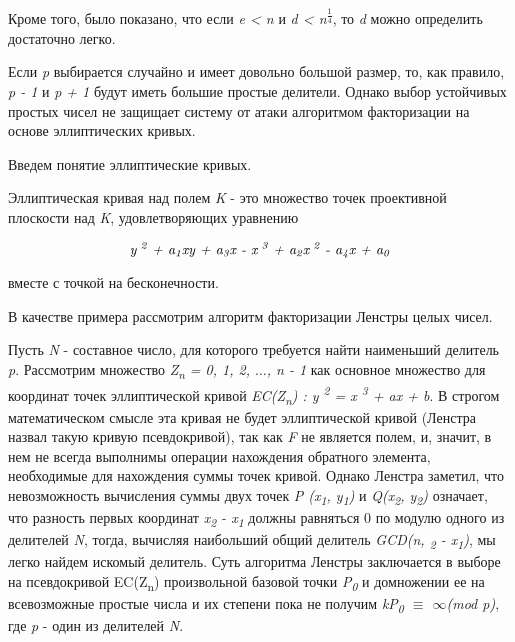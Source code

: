   Кроме того, было показано, что если \textit{e < n} и \textit{d < n\textsuperscript{ {$\frac{1}{4}$}}}, то \textit{d} можно определить достаточно
легко.
  
  Если \textit{p} выбирается случайно и имеет довольно большой размер, то, как правило, \textit{p - 1} и \textit{p + 1} будут иметь 
большие простые делители. Однако выбор устойчивых простых чисел не защищает систему от атаки алгоритмом факторизации на основе 
эллиптических кривых.

  Введем понятие эллиптические кривых.
  
    \begin{definition}
      Эллиптическая кривая над полем \textit{K} - это множество точек проективной плоскости над \textit{K}, удовлетворяющих уравнению
      
	\begin{equation}
	  \textit{y\textsuperscript{ 2} + a\textsubscript{1}xy + a\textsubscript{3}x - x\textsuperscript{ 3} + a\textsubscript{2}x\textsuperscript{ 2} - a\textsubscript{4}x + a\textsubscript{0}}
	\end{equation}
      
      вместе с точкой на бесконечности.    
    \end{definition}
    
  В качестве примера рассмотрим алгоритм факторизации Ленстры целых чисел.
  
  Пусть \textit{N} - составное число, для которого требуется найти наименьший делитель \textit{p}. Рассмотрим множество 
\textit{Z\textsubscript{n} = {0, 1, 2, {$\dots$}, n - 1}} как основное множество для координат точек эллиптической кривой 
\textit{EC(Z\textsubscript{n}) : y\textsuperscript{ 2} = x\textsuperscript{ 3} + ax + b}. В строгом математическом смысле эта кривая 
не будет эллиптической кривой (Ленстра назвал такую кривую псевдокривой), так как \textit{F} не является полем, и, значит, в нем не 
всегда выполнимы операции нахождения обратного элемента, необходимые для нахождения суммы точек кривой. Однако Ленстра заметил, 
что невозможность вычисления суммы двух точек \textit{P (x\textsubscript{1}, y\textsubscript{1})} и \textit{Q(x\textsubscript{2}, y\textsubscript{2})} означает,
что разность первых координат \textit{x\textsubscript{2} - x\textsubscript{1}} должны равняться 0 по модулю одного из делителей \textit{N}, 
тогда, вычисляя наибольший общий делитель \textit{GCD(n, \textsubscript{2} - x\textsubscript{1})}, мы легко найдем искомый делитель. 
Суть алгоритма Ленстры заключается в выборе на псевдокривой EC(Z\textsubscript{n}) произвольной базовой точки \textit{P\textsubscript{0}} 
и домножении ее на всевозможные простые числа и их степени пока не получим \textit{kP\textsubscript{0} {$\equiv$} {$\infty$}(mod p)}, 
где \textit{p} - один из делителей \textit{N}.
 

